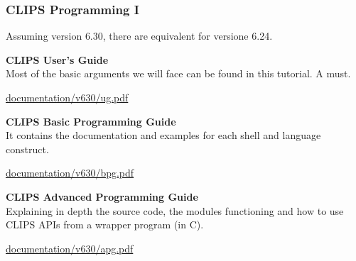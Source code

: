 \documentclass[xcolor={usenames,dvipsnames,svgnames}, compress]{beamer}
\begin{document}
\begin{frame}
  
  \frametitle{CLIPS Programming I}
  
  Assuming version \textsf{6.30}, there are equivalent for versione \textsf{6.24}.\par\bigskip
  
  
  \textbf{CLIPS User's Guide}\\
  Most of the basic arguments we will face can be found in this
  tutorial. A must.
  \begin{flushright}
    \vspace{-5pt}
    \href{http://clipsrules.sourceforge.net/documentation/v630/ug.pdf}{documentation/v630/ug.pdf}
  \end{flushright}
  
  
  
  \textbf{CLIPS Basic Programming Guide}\\
  It contains the documentation and examples for each shell and
  language construct.
  \begin{flushright}
    \vspace{-5pt}
    \href{http://clipsrules.sourceforge.net/documentation/v630/bpg.pdf}{documentation/v630/bpg.pdf}
  \end{flushright}
  
  
  \textbf{CLIPS Advanced Programming Guide}\\
  Explaining in depth the source code, the modules functioning and how to use CLIPS APIs from a wrapper program (in C).
   \begin{flushright}
    \vspace{-5pt}
    \href{http://clipsrules.sourceforge.net/documentation/v630/apg.pdf}{documentation/v630/apg.pdf}
  \end{flushright}
  
\end{frame}
\end{document}

